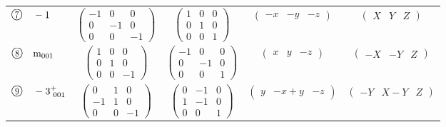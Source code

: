 \documentclass[fleqn,10pt,landscape]{jsarticle}
\begin{document}
\begin{center}
\begin{longtable}{lcccc}
$ {\ooalign{\hfil\resizebox{.8\width}{\height}{7}\hfil\crcr\raise.1ex\hbox{\large$\bigcirc$}}}\quad -1 $ & $ \begin{pmatrix} -1 & 0 & 0 \\ 0 & -1 & 0 \\ 0 & 0 & -1 \end{pmatrix} $ & $ \begin{pmatrix} 1 & 0 & 0 \\ 0 & 1 & 0 \\ 0 & 0 & 1 \end{pmatrix} $ & $ \begin{pmatrix} - x & - y & - z \end{pmatrix} $ & $ \begin{pmatrix} X & Y & Z \end{pmatrix} $ \\
$ {\ooalign{\hfil\resizebox{.8\width}{\height}{8}\hfil\crcr\raise.1ex\hbox{\large$\bigcirc$}}}\quad {\rm m}_{001} $ & $ \begin{pmatrix} 1 & 0 & 0 \\ 0 & 1 & 0 \\ 0 & 0 & -1 \end{pmatrix} $ & $ \begin{pmatrix} -1 & 0 & 0 \\ 0 & -1 & 0 \\ 0 & 0 & 1 \end{pmatrix} $ & $ \begin{pmatrix} x & y & - z \end{pmatrix} $ & $ \begin{pmatrix} - X & - Y & Z \end{pmatrix} $ \\
$ {\ooalign{\hfil\resizebox{.8\width}{\height}{9}\hfil\crcr\raise.1ex\hbox{\large$\bigcirc$}}}\quad -3^{+}_{\,\,001} $ & $ \begin{pmatrix} 0 & 1 & 0 \\ -1 & 1 & 0 \\ 0 & 0 & -1 \end{pmatrix} $ & $ \begin{pmatrix} 0 & -1 & 0 \\ 1 & -1 & 0 \\ 0 & 0 & 1 \end{pmatrix} $ & $ \begin{pmatrix} y & - x + y & - z \end{pmatrix} $ & $ \begin{pmatrix} - Y & X - Y & Z \end{pmatrix} $ \\

\end{longtable}
\end{center}
\end{document}
